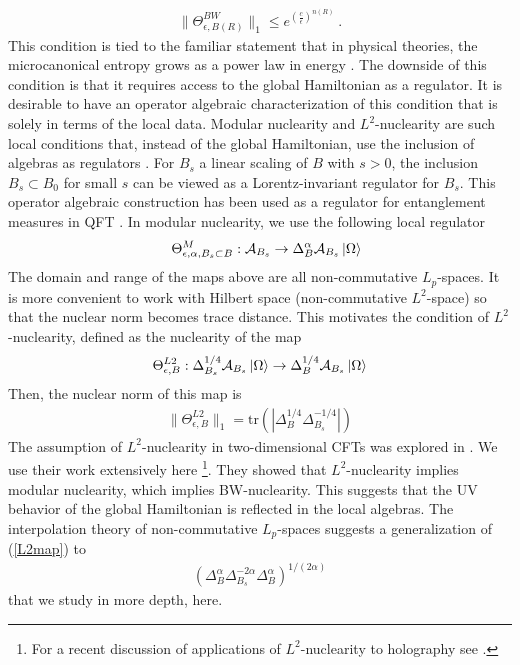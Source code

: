 \documentclass[a4paper,11pt]{article}
\theoremstyle{definition}
\newcommand{\mA}{\mathcal{A}}
\newcommand{\nn}{\nonumber}
\newcommand{\lb}{\left(}
\newcommand{\rb}{\right)}
\newcommand{\ep}{\epsilon}
\newcommand{\tr}{\text{tr}}
\begin{document}
\begin{eqnarray}
    \|\Theta^{BW}_{\ep,B(R)}\|_1\leq e^{\lb\frac{c}{\ep}\rb^{n(R)}}\ .
\end{eqnarray}
This condition is tied to the familiar statement that in physical theories, the microcanonical entropy grows as a power law in energy \cite{narnhofer1994entropy}. The downside of this condition is that it requires access to the global Hamiltonian as a regulator. It is desirable to have an operator algebraic characterization of this condition that is solely in terms of the local data. Modular nuclearity and $L^2$-nuclearity are such local conditions that, instead of the global Hamiltonian, use the inclusion of algebras as regulators \cite{buchholz1990nuclear,buchholz1990nuclear2,buchholz2007nuclearity}. For $B_s$ a linear scaling of $B$ with $s>0$, the inclusion $B_s\subset B_0$ for small $s$ can be viewed as a Lorentz-invariant regulator for $B_s$. This operator algebraic construction has been used as a regulator for entanglement measures in QFT  \cite{narnhofer2002entanglement,hollands2018entanglement,casini2015mutual}.
In modular nuclearity, we use the following local regulator
\begin{eqnarray}
&&\Theta^M_{\ep,\alpha,B_s\subset B}:\mA_{B_s}\to \Delta_B^\alpha \mA_{B_s}\ket{\Omega}
\end{eqnarray}
The domain and range of the maps above are all non-commutative $L_p$-spaces. 
It is more convenient to work with Hilbert space (non-commutative $L^2$-space) so that the nuclear norm becomes trace distance. This motivates the condition of $L^2$-nuclearity, defined as the nuclearity of the map 
\begin{eqnarray}
    \Theta^{L2}_{\ep,B}:\Delta_{B_s}^{1/4}\mA_{B_s}\ket{\Omega}\to \Delta_B^{1/4}\mA_{B_s}\ket{\Omega}
\end{eqnarray}
Then, the nuclear norm of this map is 
\begin{eqnarray}\label{L2map}
    \|\Theta^{L2}_{\ep,B}\|_1=\tr(|\Delta_B^{1/4}\Delta_{B_s}^{-1/4}|)
\end{eqnarray}
The assumption of $L^2$-nuclearity in two-dimensional CFTs was explored in \cite{buchholz2007nuclearity}. We use their work extensively here \footnote{For a recent discussion of applications of $L^2$-nuclearity to holography see \cite{Ceyhan:2025qrj}.}. They showed that $L^2$-nuclearity implies modular nuclearity, which implies BW-nuclearity. This suggests that the UV behavior of the global Hamiltonian is reflected in the local algebras. The interpolation theory of non-commutative $L_p$-spaces suggests a generalization of (\ref{L2map}) to \cite{furuya2023monotonic}
\begin{eqnarray}
    \lb\Delta_B^\alpha \Delta_{B_s}^{-2\alpha}\Delta_B^\alpha\rb^{1/(2\alpha)}
\end{eqnarray}
that we study in more depth, here.
\end{document}
